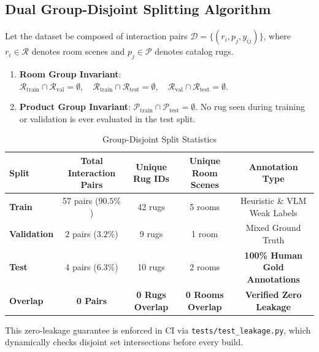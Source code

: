 \documentclass[11pt,a4paper]{article}
\begin{document}
\subsection{Dual Group-Disjoint Splitting Algorithm}
Let the dataset be composed of interaction pairs $\mathcal{D} = \{(r_i, p_j, y_{ij})\}$, where $r_i \in \mathcal{R}$ denotes room scenes and $p_j \in \mathcal{P}$ denotes catalog rugs.
\begin{enumerate}[leftmargin=*]
    \item \textbf{Room Group Invariant}: $\mathcal{R}_{\text{train}} \cap \mathcal{R}_{\text{val}} = \emptyset, \quad \mathcal{R}_{\text{train}} \cap \mathcal{R}_{\text{test}} = \emptyset, \quad \mathcal{R}_{\text{val}} \cap \mathcal{R}_{\text{test}} = \emptyset$.
    \item \textbf{Product Group Invariant}: $\mathcal{P}_{\text{train}} \cap \mathcal{P}_{\text{test}} = \emptyset$. No rug seen during training or validation is ever evaluated in the test split.
\end{enumerate}

\begin{table}[htbp]
\centering
\caption{Group-Disjoint Split Statistics}
\label{tab:splits}
\begin{tabular}{lcccc}
\toprule
\textbf{Split} & \textbf{Total Interaction Pairs} & \textbf{Unique Rug IDs} & \textbf{Unique Room Scenes} & \textbf{Annotation Type} \\
\midrule
\textbf{Train} & 57 pairs ($90.5\%$) & 42 rugs & 5 rooms & Heuristic \& VLM Weak Labels \\
\textbf{Validation} & 2 pairs ($3.2\%$) & 9 rugs & 1 room & Mixed Ground Truth \\
\textbf{Test} & 4 pairs ($6.3\%$) & 10 rugs & 2 rooms & \textbf{100\% Human Gold Annotations} \\
\midrule
\textbf{Overlap} & \textbf{0 Pairs} & \textbf{0 Rugs Overlap} & \textbf{0 Rooms Overlap} & \textbf{Verified Zero Leakage} \\
\bottomrule
\end{tabular}
\end{table}

This zero-leakage guarantee is enforced in CI via \texttt{tests/test\_leakage.py}, which dynamically checks disjoint set intersections before every build.

\end{document}

